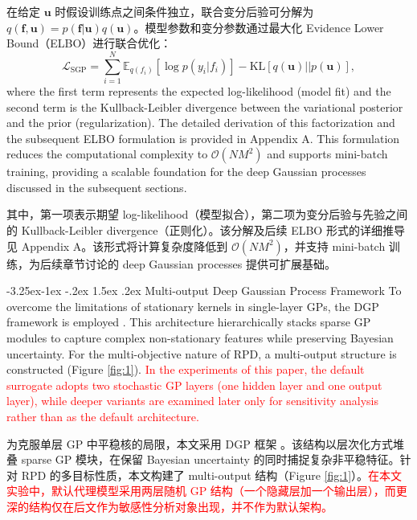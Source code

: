 \documentclass[11pt]{article}
\makeatletter
\renewcommand\subsection{\@startsection{subsection}{2}{\z@}%
                                         {-3.25ex\@plus -1ex \@minus -.2ex}%
                                         {1.5ex \@plus .2ex}%
                                         {\normalfont\fontfamily{phv}\fontsize{14}{17}\bfseries}}
\makeatother
\begin{document}
在给定 $\mathbf{u}$ 时假设训练点之间条件独立，联合变分后验可分解为 $q(\mathbf{f}, \mathbf{u}) = p(\mathbf{f}|\mathbf{u})q(\mathbf{u})$。模型参数和变分参数通过最大化 Evidence Lower Bound（ELBO）进行联合优化：
\begin{equation}
	\mathcal{L}_{\text{SGP}} = \sum_{i=1}^{N} \mathbb{E}_{q(f_i)} [\log p(y_i | f_i)] - \text{KL}[q(\mathbf{u}) || p(\mathbf{u})],
\end{equation}
where the first term represents the expected log-likelihood (model fit) and the second term is the Kullback-Leibler divergence between the variational posterior and the prior (regularization). The detailed derivation of this factorization and the subsequent ELBO formulation is provided in Appendix A. This formulation reduces the computational complexity to $\mathcal{O}(NM^2)$ and supports mini-batch training, providing a scalable foundation for the deep Gaussian processes discussed in the subsequent sections.

其中，第一项表示期望 log-likelihood（模型拟合），第二项为变分后验与先验之间的 Kullback-Leibler divergence（正则化）。该分解及后续 ELBO 形式的详细推导见 Appendix A。该形式将计算复杂度降低到 $\mathcal{O}(NM^2)$，并支持 mini-batch 训练，为后续章节讨论的 deep Gaussian processes 提供可扩展基础。


\subsection{Multi-output Deep Gaussian Process Framework} \label{s:sec2.3}
To overcome the limitations of stationary kernels in single-layer GPs, the DGP framework is employed \cite{Li2025}. This architecture hierarchically stacks sparse GP modules to capture complex non-stationary features while preserving Bayesian uncertainty. For the multi-objective nature of RPD, a multi-output structure is constructed (Figure \ref{fig:1}). \textcolor{red}{In the experiments of this paper, the default surrogate adopts two stochastic GP layers (one hidden layer and one output layer), while deeper variants are examined later only for sensitivity analysis rather than as the default architecture.}

为克服单层 GP 中平稳核的局限，本文采用 DGP 框架 \cite{Li2025}。该结构以层次化方式堆叠 sparse GP 模块，在保留 Bayesian uncertainty 的同时捕捉复杂非平稳特征。针对 RPD 的多目标性质，本文构建了 multi-output 结构（Figure \ref{fig:1}）。\textcolor{red}{在本文实验中，默认代理模型采用两层随机 GP 结构（一个隐藏层加一个输出层），而更深的结构仅在后文作为敏感性分析对象出现，并不作为默认架构。}
\end{document}
